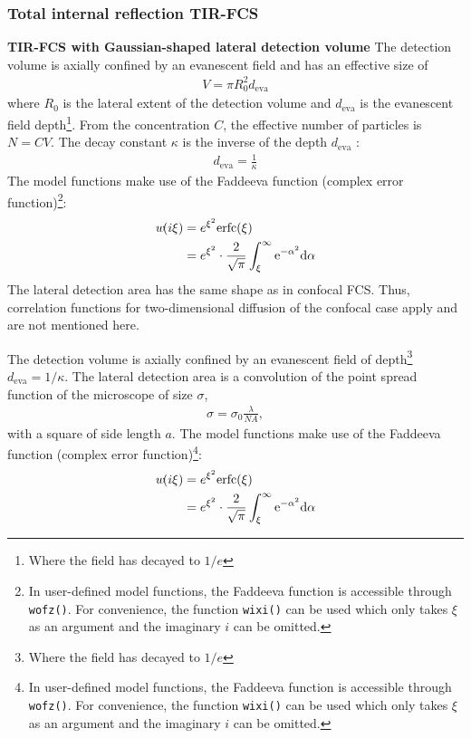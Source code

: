 \subsubsection{Total internal reflection TIR-FCS}
\label{sec:theor.exten.total}
\textbf{TIR-FCS with Gaussian-shaped lateral detection volume}
The detection volume is axially confined by an evanescent field and has an effective size of
\begin{align}
V = \pi R_0^2 d_\mathrm{eva}
\end{align} 
where $R_0$ is the lateral extent of the detection volume and $d_\mathrm{eva}$ is the evanescent field depth\footnote{Where the field has decayed to $1/e$}. From the concentration $C$, the effective number of particles is $N=CV$.
The decay constant $\kappa$ is the inverse of the depth $d_\mathrm{eva}$ :
\begin{align}
d_\mathrm{eva} = \frac{1}{\kappa}
\end{align} 
The model functions make use of the Faddeeva function (complex error function)\footnote{In user-defined model functions, the Faddeeva function is accessible through \texttt{wofz()}. For convenience, the function \texttt{wixi()} can be used which only takes $\xi$ as an argument and the imaginary $i$ can be omitted.}:
\begin{align}
w\!(i\xi) &= e^{\xi^2} \mathrm{erfc}(\xi) \\
\notag &= e^{\xi^2} \cdot  \frac{2}{\sqrt{\pi}} \int_\xi^\infty \mathrm{e}^{-\alpha^2} \mathrm{d\alpha} \label{eq:faddeeva}
\end{align} 
The lateral detection area has the same shape as in confocal FCS. Thus, correlation functions for two-dimensional diffusion of the confocal case apply and are not mentioned here.

The detection volume is axially confined by an evanescent field of depth\footnote{Where the field has decayed to $1/e$} $d_\mathrm{eva} = 1 / \kappa$.
The lateral detection area is a convolution of the point spread function of the microscope of size $\sigma$,
\begin{align}
\sigma = \sigma_0  \frac{\lambda}{\mathit{NA}},
\end{align} 
with a square of side length $a$.
The model functions make use of the Faddeeva function (complex error function)\footnote{In user-defined model functions, the Faddeeva function is accessible through \texttt{wofz()}. For convenience, the function \texttt{wixi()} can be used which only takes $\xi$ as an argument and the imaginary $i$ can be omitted.}:
\begin{align}
w\!(i\xi) &= e^{\xi^2} \mathrm{erfc}(\xi) \\
\notag &= e^{\xi^2} \cdot  \frac{2}{\sqrt{\pi}} \int_\xi^\infty \mathrm{e}^{-\alpha^2} \mathrm{d\alpha} \label{eq:faddeeva}
\end{align} 

